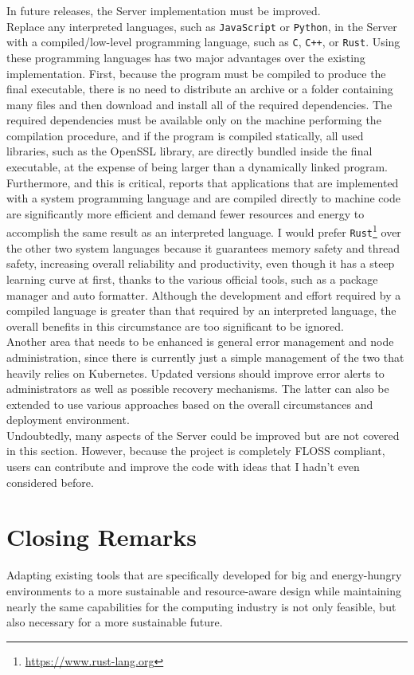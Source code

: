 In future releases, the Server implementation must be improved. \\ %
Replace any interpreted languages, such as \texttt{JavaScript} or \texttt{Python},
in the Server with a compiled/low-level programming language, such as \texttt{C},
\texttt{C++}, or \texttt{Rust}. Using these programming languages has two major advantages
over the existing implementation. First, because the program must be compiled to
produce the final executable, there is no need to distribute an archive or a
folder containing many files and then download and install all of the required
dependencies. The required dependencies must be available only on the machine performing
the compilation procedure, and if the program is compiled statically, all used libraries,
such as the OpenSSL library, are directly bundled inside the final executable,
at the expense of being larger than a dynamically linked program. Furthermore,
and this is critical, \cite{programming_languages_efficiency} reports that applications
that are implemented with a system programming language and are compiled directly
to machine code are significantly more efficient and demand fewer resources and energy
to accomplish the same result as an interpreted language. I would prefer \texttt{Rust}\footnote{\url{https://www.rust-lang.org}}
over the other two system languages because it guarantees memory safety and thread
safety, increasing overall reliability and productivity, even though it has a steep
learning curve at first, thanks to the various official tools, such as a package
manager and auto formatter. Although the development and effort required by a
compiled language is greater than that required by an interpreted language, the overall
benefits in this circumstance are too significant to be ignored. \\ %
Another area that needs to be enhanced is general error management and node administration,
since there is currently just a simple management of the two that heavily relies
on Kubernetes. Updated versions should improve error alerts to administrators as
well as possible recovery mechanisms. The latter can also be extended to use
various approaches based on the overall circumstances and deployment environment.
\\ %
Undoubtedly, many aspects of the Server could be improved but are not covered in
this section. However, because the project is completely FLOSS compliant, users
can contribute and improve the code with ideas that I hadn't even considered
before.

\section{Closing Remarks}
\label{sec:conclusions_closing_remarks}

Adapting existing tools that are specifically developed for big and energy-hungry
environments to a more sustainable and resource-aware design while maintaining nearly
the same capabilities for the computing industry is not only feasible, but also
necessary for a more sustainable future.